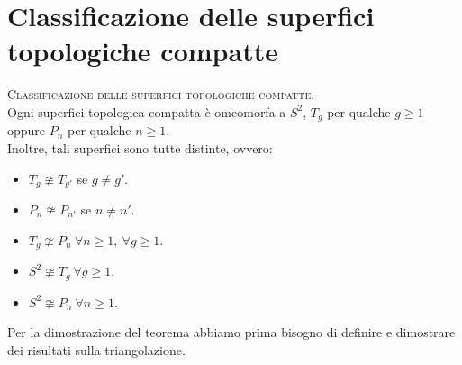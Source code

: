 \section{Classificazione delle superfici topologiche compatte}
\begin{theorema}\textsc{Classificazione delle superfici topologiche compatte.}\\ \label{classificazionesuperficicompatte}
Ogni superfici topologica compatta è omeomorfa a $S^2$, $T_g$ per qualche $g\geq 1$ oppure $P_n$ per qualche $n\geq 1$.\\
Inoltre, tali superfici sono tutte distinte, ovvero:
\begin{itemize}
	\item $T_g\ncong T_{g'}$ se $g\neq g'$.
	\item $P_n\ncong P_{n'}$ se $n\neq n'$.
	\item $T_g\ncong P_{n}\ \forall n\geq 1,\ \forall g\geq 1$.
	\item $S^2\ncong T_g\ \forall g\geq 1$.
	\item $S^2\ncong P_n\ \forall n\geq 1$.
\end{itemize}
\vspace{-3mm}
\end{theorema}
Per la dimostrazione del teorema abbiamo prima bisogno di definire e dimostrare dei risultati sulla triangolazione.
